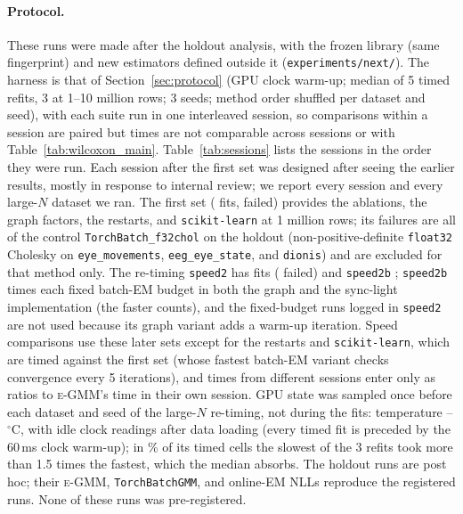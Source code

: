 \documentclass[10pt]{article} %
\newcommand{\egmm}{\textsc{e-GMM}}
\begin{document}
\paragraph{Protocol.} These runs were made after the holdout analysis, with the frozen library (same fingerprint) and new estimators defined outside it (\texttt{experiments/next/}). The harness is that of Section~\ref{sec:protocol} (GPU clock warm-up; median of 5 timed refits, 3 at 1--10 million rows; 3 seeds; method order shuffled per dataset and seed), with each suite run in one interleaved session, so comparisons within a session are paired but times are not comparable across sessions or with Table~\ref{tab:wilcoxon_main}. Table~\ref{tab:sessions} lists the sessions in the order they were run. Each session after the first set was designed after seeing the earlier results, mostly in response to internal review; we report every session and every large-$N$ dataset we ran. The first set (\rXNFits{} fits, \rXNFail{} failed) provides the ablations, the graph factors, the restarts, and \texttt{scikit-learn} at 1 million rows; its failures are all of the control \texttt{TorchBatch\_f32chol} on the holdout (non-positive-definite \texttt{float32} Cholesky on \texttt{eye\_movements}, \texttt{eeg\_eye\_state}, and \texttt{dionis}) and are excluded for that method only. The re-timing \texttt{speed2} has \rSNFits{} fits (\rSNFail{} failed) and \texttt{speed2b} \rSbNFits{}; \texttt{speed2b} times each fixed batch-EM budget in both the graph and the sync-light implementation (the faster counts), and the fixed-budget runs logged in \texttt{speed2} are not used because its graph variant adds a warm-up iteration. Speed comparisons use these later sets except for the restarts and \texttt{scikit-learn}, which are timed against the first set (whose fastest batch-EM variant checks convergence every 5 iterations), and times from different sessions enter only as ratios to \egmm{}'s time in their own session. GPU state was sampled once before each dataset and seed of the large-$N$ re-timing, not during the fits: temperature \rSTempMin--\rSTempMax\,$^\circ$C, with idle clock readings after data loading (every timed fit is preceded by the 60\,ms clock warm-up); in \rSLgSpreadShare\% of its timed cells the slowest of the 3 refits took more than 1.5 times the fastest, which the median absorbs. The holdout runs are post hoc; their \egmm{}, \texttt{TorchBatchGMM}, and online-EM NLLs reproduce the registered runs. None of these runs was pre-registered.
\end{document}
